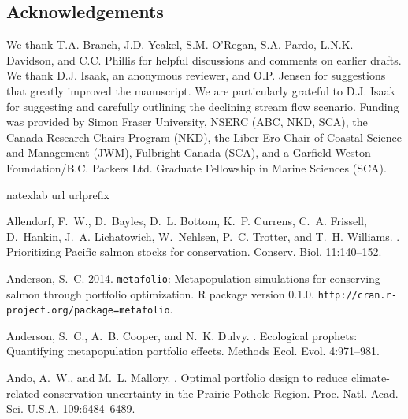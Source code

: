 \documentclass[12pt,english]{article}
\begin{document}
\begin{spacing}{1.3}
\section{Acknowledgements}\label{acknowledgements}

We thank T.A. Branch, J.D. Yeakel, S.M. O'Regan, S.A. Pardo, L.N.K. Davidson, and C.C. Phillis for helpful discussions and comments on earlier drafts. We thank D.J. Isaak, an anonymous reviewer, and O.P. Jensen for suggestions that greatly improved the manuscript. We are particularly grateful to D.J. Isaak for suggesting and carefully outlining the declining stream flow scenario. Funding was provided by Simon Fraser University, NSERC (ABC, NKD, SCA), the Canada Research Chairs Program (NKD), the Liber Ero Chair of Coastal Science and Management (JWM), Fulbright Canada (SCA), and a Garfield Weston Foundation/B.C. Packers Ltd. Graduate Fellowship in Marine Sciences (SCA).

%
%
%
\begin{thebibliography}{64}
\expandafter\ifx\csname natexlab\endcsname\relax\def\natexlab#1{#1}\fi
\expandafter\ifx\csname url\endcsname\relax
  \def\url#1{{\tt #1}}\fi
\expandafter\ifx\csname urlprefix\endcsname\relax\def\urlprefix{URL }\fi

Allendorf, F.~W., D.~Bayles, D.~L. Bottom, K.~P. Currens, C.~A. Frissell,
  D.~Hankin, J.~A. Lichatowich, W.~Nehlsen, P.~C. Trotter, and T.~H. Williams.
.
\newblock Prioritizing {Pacific} salmon stocks for conservation.
\newblock Conserv. Biol. 11:140--152.

Anderson, S.~C. 2014.
\newblock \texttt{metafolio}: Metapopulation simulations for conserving salmon through
  portfolio optimization. \textsf{R} package version 0.1.0.
  \texttt{http://cran.r-project.org/package=metafolio}.

Anderson, S.~C., A.~B. Cooper, and N.~K. Dulvy.
.
\newblock Ecological prophets: Quantifying metapopulation portfolio effects.
\newblock Methods Ecol. Evol. 4:971--981.

Ando, A.~W., and M.~L. Mallory.
.
\newblock Optimal portfolio design to reduce climate-related conservation
  uncertainty in the {Prairie Pothole Region}.
\newblock Proc. Natl. Acad. Sci. U.S.A. 109:6484--6489.


\end{thebibliography}
\end{spacing}
\end{document}
